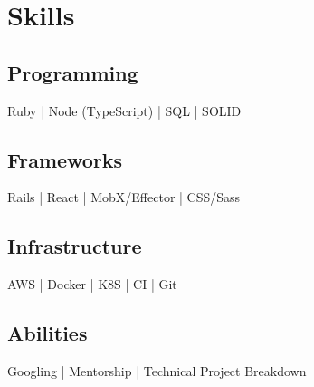 \section{Skills}
  \subsection{Programming}
  Ruby | Node (TypeScript) | SQL | SOLID  \\
  \subsection{Frameworks}
  Rails | React | MobX/Effector | CSS/Sass \\
  \subsection{Infrastructure}
  AWS | Docker | K8S | CI | Git \\
  \subsection{Abilities}
  Googling | Mentorship | Technical Project Breakdown
